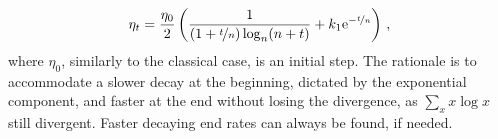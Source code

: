 \begin{equation}
\label{eq:leariningrate}
\eta_t = \frac{\eta_0}{2}\left(\frac{1}{(1+\nicefrac{t}{n})\log_n(n+t)} +
k_1\mathrm{e}^{-\nicefrac{t}{n}}\right)\,,
\end{equation}
%
where $\eta_0$, similarly to the classical case, is an initial step. The
rationale is to accommodate a slower decay at the beginning,
dictated by the exponential component, and faster at the end without losing the
divergence, as $\sum_x x\log x$ still divergent. Faster decaying end rates can
always be found, if needed.
